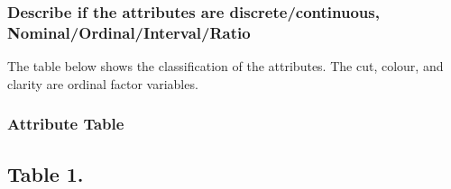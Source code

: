 \documentclass[
]{article}
\begin{document}
\subsubsection{Describe if the attributes are discrete/continuous,
Nominal/Ordinal/Interval/Ratio}\label{describe-if-the-attributes-are-discretecontinuous-nominalordinalintervalratio}

The table below shows the classification of the attributes. The cut,
colour, and clarity are ordinal factor variables.

\subsubsection{Attribute Table}\label{attribute-table}

\subsection{Table 1.}\label{table-1.}
\end{document}
